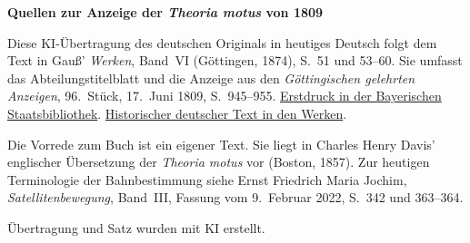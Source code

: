 \clearpage\thispagestyle{empty}
\begin{center}\textbf{Quellen zur Anzeige der \textit{Theoria motus} von 1809}\end{center}
\noindent Diese KI-Übertragung des deutschen Originals in heutiges Deutsch folgt dem Text in Gauß’ \textit{Werken}, Band~VI (Göttingen, 1874), S.~51 und 53--60. Sie umfasst das Abteilungstitelblatt und die Anzeige aus den \textit{Göttingischen gelehrten Anzeigen}, 96.~Stück, 17.~Juni 1809, S.~945--955. \href{https://www.digitale-sammlungen.de/de/view/bsb10538675?page=947}{Erstdruck in der Bayerischen Staatsbibliothek}. \href{https://gdz.sub.uni-goettingen.de/id/PPN236007467}{Historischer deutscher Text in den Werken}.
\par\smallskip\noindent Die Vorrede zum Buch ist ein eigener Text. Sie liegt in Charles Henry Davis’ englischer Übersetzung der \textit{Theoria motus} vor (Boston, 1857). Zur heutigen Terminologie der Bahnbestimmung siehe Ernst Friedrich Maria Jochim, \textit{Satellitenbewegung}, Band~III, Fassung vom 9.~Februar 2022, S.~342 und 363--364.
\par\smallskip\noindent Übertragung und Satz wurden mit KI erstellt.
\clearpage
